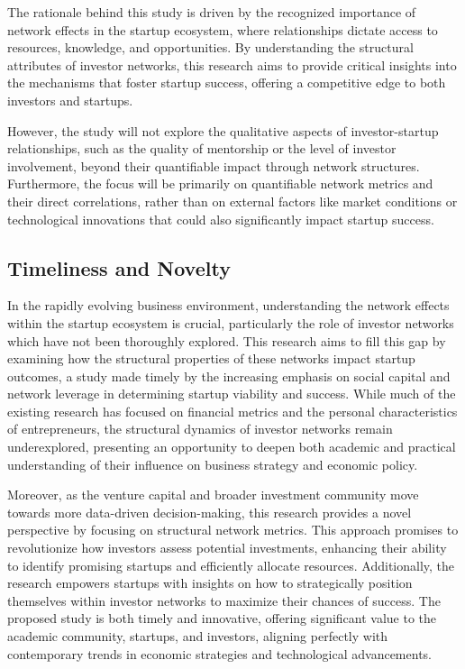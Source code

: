 \documentclass[a4paper,11pt]{article}
\begin{document}
The rationale behind this study is driven by the recognized importance of network effects in the startup ecosystem, where relationships dictate access to resources, knowledge, and opportunities. By understanding the structural attributes of investor networks, this research aims to provide critical insights into the mechanisms that foster startup success, offering a competitive edge to both investors and startups.

However, the study will not explore the qualitative aspects of investor-startup relationships, such as the quality of mentorship or the level of investor involvement, beyond their quantifiable impact through network structures. Furthermore, the focus will be primarily on quantifiable network metrics and their direct correlations, rather than on external factors like market conditions or technological innovations that could also significantly impact startup success.

\subsection{Timeliness and Novelty}

In the rapidly evolving business environment, understanding the network effects within the startup ecosystem is crucial, particularly the role of investor networks which have not been thoroughly explored. This research aims to fill this gap by examining how the structural properties of these networks impact startup outcomes, a study made timely by the increasing emphasis on social capital and network leverage in determining startup viability and success. While much of the existing research has focused on financial metrics and the personal characteristics of entrepreneurs, the structural dynamics of investor networks remain underexplored, presenting an opportunity to deepen both academic and practical understanding of their influence on business strategy and economic policy.

Moreover, as the venture capital and broader investment community move towards more data-driven decision-making, this research provides a novel perspective by focusing on structural network metrics. This approach promises to revolutionize how investors assess potential investments, enhancing their ability to identify promising startups and efficiently allocate resources. Additionally, the research empowers startups with insights on how to strategically position themselves within investor networks to maximize their chances of success. The proposed study is both timely and innovative, offering significant value to the academic community, startups, and investors, aligning perfectly with contemporary trends in economic strategies and technological advancements.
\end{document}
